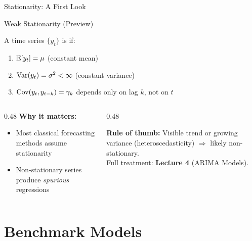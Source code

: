 \documentclass[aspectratio=169, 11pt]{beamer}
\begin{document}
\begin{frame}{Stationarity: A First Look}
  \begin{definitionbox}{Weak Stationarity (Preview)}
    {\small A time series $\{y_t\}$ is  if:
    \begin{enumerate}
      \item $\mathbb{E}[y_t] = \mu$ (constant mean)
      \item $\operatorname{Var}(y_t) = \sigma^2 < \infty$ (constant variance)
      \item $\operatorname{Cov}(y_t, y_{t-k}) = \gamma_k$ depends only on lag $k$, not on $t$
    \end{enumerate}}
  \end{definitionbox}
  \vspace{0.05cm}
  \begin{columns}[T]
    \begin{column}{0.48\textwidth}
      \textbf{Why it matters:}
      {\small\begin{itemize}
        \item Most classical forecasting methods assume stationarity
        \item Non-stationary series produce \emph{spurious} regressions
      \end{itemize}}
    \end{column}
    \begin{column}{0.48\textwidth}
      \begin{keybox}
        \small
        \textbf{Rule of thumb:} Visible trend or growing variance (heteroscedasticity)
        $\Rightarrow$ likely non-stationary.\\[2pt]
        Full treatment: \textbf{Lecture 4} (ARIMA Models).
      \end{keybox}
    \end{column}
  \end{columns}
\end{frame}

\section{Benchmark Models}
\end{document}
